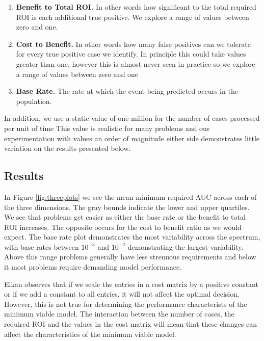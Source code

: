 \documentclass[11pt,a4paper]{article}
\begin{document}
\begin{enumerate}
        \item \textbf{Benefit to Total ROI.} In other words how significant to the total required ROI is
each additional true positive. We explore a range of values between zero and one.

        \item \textbf{Cost to Benefit.} In other words how many false positives can we tolerate for every
true positive case we identify. In principle this could take values greater than one, however this
is almost never seen in practice so we explore a range of values between zero and one

        \item \textbf{Base Rate.} The rate at which the event being predicted occurs in the population.

\end{enumerate}

In addition, we use a static value of one million for the number of cases processed per unit of time
This value is realistic for many problems and our experimentation with values
an order of magnitude either side demonstrates little variation on the results presented below.

\subsection{Results}

In Figure \ref{fig:threeplots} we see the mean minimum required AUC across each of the three dimensions.
The gray bounds indicate the lower and upper quartiles. We see that problems get easier as either the base
rate or the benefit to total ROI increases. The opposite occurs for the cost to benefit ratio as we would
expect. The base rate plot demonstrates the most variability across the spectrum, with base rates between
$10^{-3}$ and $10^{-2}$ demonstrating the largest variability. Above this range problems generally have less
strenuous requirements and below it most problems require demanding model performance.

Elkan \cite{Elkan2001} observes that if we scale the entries in a cost matrix by a positive constant or if
we add a constant to all entries, it will not affect the optimal decision. However, this
is not true for determining the performance characterists of the minimum viable model.
The interaction between the number of cases, the required ROI and the values in the cost
matrix will mean that these changes can affect the characteristics of the minimum viable model.
\end{document}
